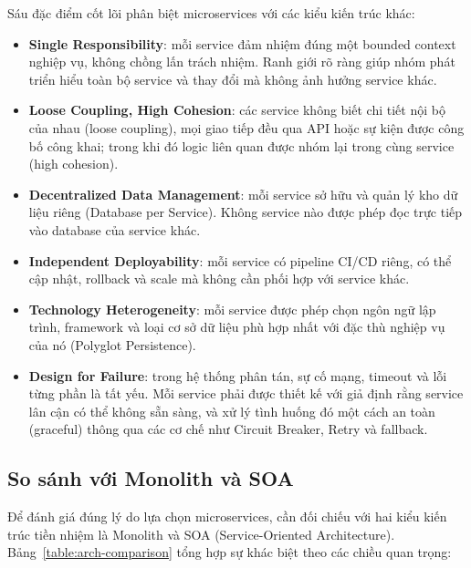 \documentclass[../DoAn.tex]{subfiles}
\begin{document}
Sáu đặc điểm cốt lõi phân biệt microservices với các kiểu kiến trúc khác:

\begin{itemize}[noitemsep]
    \item \textbf{Single Responsibility}: mỗi service đảm nhiệm đúng một bounded context
          nghiệp vụ, không chồng lấn trách nhiệm. Ranh giới rõ ràng giúp nhóm phát triển
          hiểu toàn bộ service và thay đổi mà không ảnh hưởng service khác.
    \item \textbf{Loose Coupling, High Cohesion}: các service không biết chi tiết nội bộ
          của nhau (loose coupling), mọi giao tiếp đều qua API hoặc sự kiện được công bố
          công khai; trong khi đó logic liên quan được nhóm lại trong cùng service
          (high cohesion).
    \item \textbf{Decentralized Data Management}: mỗi service sở hữu và quản lý kho dữ
          liệu riêng (Database per Service). Không service nào được phép đọc trực tiếp vào
          database của service khác.
    \item \textbf{Independent Deployability}: mỗi service có pipeline CI/CD riêng, có thể
          cập nhật, rollback và scale mà không cần phối hợp với service khác.
    \item \textbf{Technology Heterogeneity}: mỗi service được phép chọn ngôn ngữ lập trình,
          framework và loại cơ sở dữ liệu phù hợp nhất với đặc thù nghiệp vụ của nó
          (Polyglot Persistence).
    \item \textbf{Design for Failure}: trong hệ thống phân tán, sự cố mạng, timeout và
          lỗi từng phần là tất yếu. Mỗi service phải được thiết kế với giả định rằng
          service lân cận có thể không sẵn sàng, và xử lý tình huống đó một cách an toàn
          (graceful) thông qua các cơ chế như Circuit Breaker, Retry và fallback.
\end{itemize}

\subsection{So sánh với Monolith và SOA}

Để đánh giá đúng lý do lựa chọn microservices, cần đối chiếu với hai kiểu kiến trúc tiền
nhiệm là Monolith và SOA (Service-Oriented Architecture). Bảng~\ref{table:arch-comparison}
tổng hợp sự khác biệt theo các chiều quan trọng:
\end{document}
